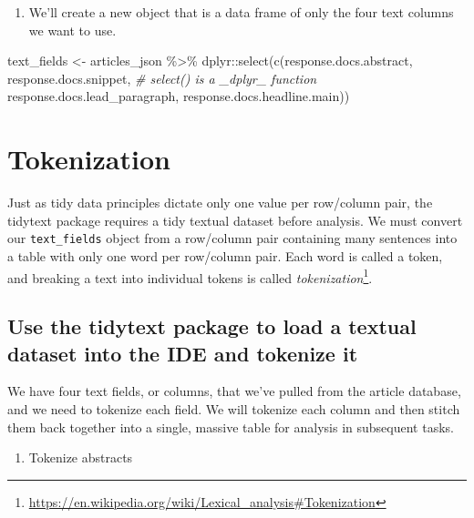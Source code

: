 \documentclass[
  krantz2]{krantz}
\makeatletter
\newenvironment{Shaded}{\begin{snugshade}}{\end{snugshade}}
\newcommand{\CommentTok}[1]{\textcolor[rgb]{0.37,0.37,0.37}{\textit{#1}}}
\newcommand{\FunctionTok}[1]{\textcolor[rgb]{0,0,0}{#1}}
\newcommand{\NormalTok}[1]{#1}
\newcommand{\OtherTok}[1]{\textcolor[rgb]{0.37,0.37,0.37}{#1}}
\newcommand{\SpecialCharTok}[1]{\textcolor[rgb]{0,0,0}{#1}}
\providecommand{\tightlist}{%
  \setlength{\itemsep}{0pt}\setlength{\parskip}{0pt}}
\newenvironment{kframe}{%
\medskip{}
\setlength{\fboxsep}{.8em}
 \def\at@end@of@kframe{}%
 \ifinner\ifhmode%
  \def\at@end@of@kframe{\end{minipage}}%
  \begin{minipage}{\columnwidth}%
 \fi\fi%
 \def\FrameCommand##1{\hskip\@totalleftmargin \hskip-\fboxsep
 \colorbox{shadecolor}{##1}\hskip-\fboxsep
     \hskip-\linewidth \hskip-\@totalleftmargin \hskip\columnwidth}%
 \MakeFramed {\advance\hsize-\width
   \@totalleftmargin\z@ \linewidth\hsize
   \@setminipage}}%
 {\par\unskip\endMakeFramed%
 \at@end@of@kframe}
\renewenvironment{Shaded}{\begin{kframe}}{\end{kframe}}
\makeatother
\begin{document}
\begin{enumerate}
\def\labelenumi{\arabic{enumi}.}
\setcounter{enumi}{2}
\tightlist
\item
  We'll create a new object that is a data frame of only the four text columns we want to use.
\end{enumerate}

\begin{Shaded}
\begin{Highlighting}[]
\NormalTok{text\_fields }\OtherTok{\textless{}{-}}\NormalTok{ articles\_json }\SpecialCharTok{\%\textgreater{}\%}
\NormalTok{  dplyr}\SpecialCharTok{::}\FunctionTok{select}\NormalTok{(}\FunctionTok{c}\NormalTok{(response.docs.abstract, response.docs.snippet, }\CommentTok{\# select() is a \_dplyr\_ function}
\NormalTok{  response.docs.lead\_paragraph, response.docs.headline.main))}
\end{Highlighting}
\end{Shaded}

\hypertarget{tokenization}{%
\section{Tokenization}\label{tokenization}}

Just as tidy data principles dictate only one value per row/column pair, the tidytext package requires a tidy textual dataset before analysis. We must convert our \texttt{text\_fields} object from a row/column pair containing many sentences into a table with only one word per row/column pair. Each word is called a token, and breaking a text into individual tokens is called \emph{tokenization}\footnote{\url{https://en.wikipedia.org/wiki/Lexical_analysis\#Tokenization}}.

\hypertarget{load-tokenize}{%
\subsection{Use the tidytext package to load a textual dataset into the IDE and tokenize it}\label{load-tokenize}}

We have four text fields, or columns, that we've pulled from the article database, and we need to tokenize each field. We will tokenize each column and then stitch them back together into a single, massive table for analysis in subsequent tasks.

\begin{enumerate}
\def\labelenumi{\arabic{enumi}.}
\tightlist
\item
  Tokenize abstracts
\end{enumerate}
\end{document}

